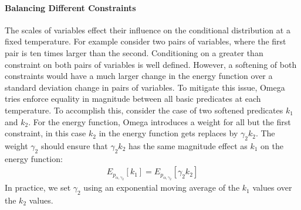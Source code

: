 \paragraph{Balancing Different Constraints}
The scales of variables effect their influence on
the conditional distribution at a fixed temperature.
For example consider two pairs of variables, where
the first pair is ten times larger than the second.
Conditioning on a greater than constraint on both
pairs of variables is well defined. However,
a softening of both constraints would have 
a much larger change in the energy function over
a standard deviation change in pairs of variables.
To mitigate this issue, Omega tries enforce equality
in magnitude between all basic predicates at each temperature.
To accomplish this, consider the case of two 
softened predicates $k_1$ and $k_2$. For the
energy function, Omega introduces a weight
for all but the first constraint, in this
case $k_2$ in the energy function gets replaces
by $\gamma_2 k_2$. The weight $\gamma_2$ should
ensure that $\gamma_2 k_2$ has the same
magnitude effect as $k_1$ on the energy
function:
\begin{align*}
E_{p_{\alpha, \gamma_2}}[k_1] = E_{p_{\alpha, \gamma_2}}[\gamma_2 k_2] 
\end{align*}
In practice, we set $\gamma_2$ using an exponential moving
average of the $k_1$ values over the $k_2$ values.